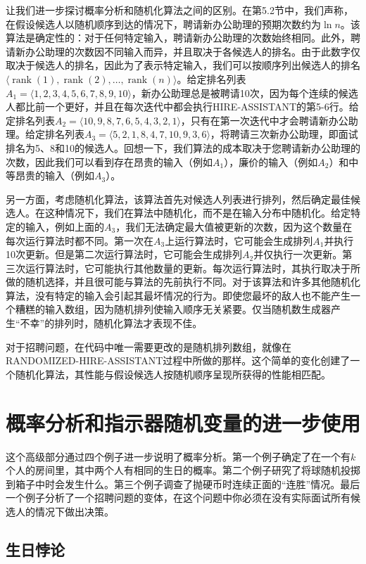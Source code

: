 \documentclass[lang=cn,newtx,10pt,scheme=chinese]{elegantbook}
\begin{document}
让我们进一步探讨概率分析和随机化算法之间的区别。在第5.2节中，我们声称，在假设候选人以随机顺序到达的情况下，聘请新办公助理的预期次数约为$\ln n$。该算法是确定性的：对于任何特定输入，聘请新办公助理的次数始终相同。此外，聘请新办公助理的次数因不同输入而异，并且取决于各候选人的排名。由于此数字仅取决于候选人的排名，因此为了表示特定输入，我们可以按顺序列出候选人的排名$\langle\operatorname{rank}(1),\operatorname{rank}(2),\ldots,\operatorname{rank}(n)\rangle$。给定排名列表$A_1=\langle 1,2,3,4,5,6,7,8,9,10\rangle$，新办公助理总是被聘请10次，因为每个连续的候选人都比前一个更好，并且在每次迭代中都会执行HIRE-ASSISTANT的第5-6行。给定排名列表$A_2=\langle 10,9,8,7,6,5,4,3,2,1\rangle$，只有在第一次迭代中才会聘请新办公助理。给定排名列表$A_3=\langle 5,2,1,8,4,7,10,9,3,6\rangle$，将聘请三次新办公助理，即面试排名为5、8和10的候选人。回想一下，我们算法的成本取决于您聘请新办公助理的次数，因此我们可以看到存在昂贵的输入（例如$A_1$），廉价的输入（例如$A_2$）和中等昂贵的输入（例如$A_3$）。

另一方面，考虑随机化算法，该算法首先对候选人列表进行排列，然后确定最佳候选人。在这种情况下，我们在算法中随机化，而不是在输入分布中随机化。给定特定的输入，例如上面的$A_3$，我们无法确定最大值被更新的次数，因为这个数量在每次运行算法时都不同。第一次在$A_3$上运行算法时，它可能会生成排列$A_1$并执行10次更新。但是第二次运行算法时，它可能会生成排列$A_2$并仅执行一次更新。第三次运行算法时，它可能执行其他数量的更新。每次运行算法时，其执行取决于所做的随机选择，并且很可能与算法的先前执行不同。对于该算法和许多其他随机化算法，没有特定的输入会引起其最坏情况的行为。即使您最坏的敌人也不能产生一个糟糕的输入数组，因为随机排列使输入顺序无关紧要。仅当随机数生成器产生“不幸”的排列时，随机化算法才表现不佳。

对于招聘问题，在代码中唯一需要更改的是随机排列数组，就像在RANDOMIZED-HIRE-ASSISTANT过程中所做的那样。这个简单的变化创建了一个随机化算法，其性能与假设候选人按随机顺序呈现所获得的性能相匹配。

\section{概率分析和指示器随机变量的进一步使用}

这个高级部分通过四个例子进一步说明了概率分析。第一个例子确定了在一个有$k$个人的房间里，其中两个人有相同的生日的概率。第二个例子研究了将球随机投掷到箱子中时会发生什么。第三个例子调查了抛硬币时连续正面的“连胜”情况。最后一个例子分析了一个招聘问题的变体，在这个问题中你必须在没有实际面试所有候选人的情况下做出决策。

\subsection{生日悖论}
\end{document}
